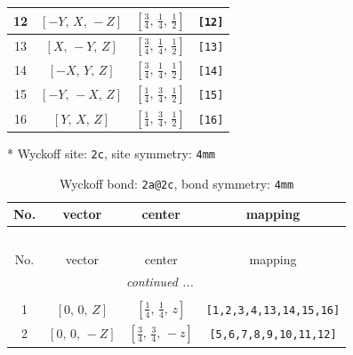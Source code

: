 \documentclass[fleqn,8pt]{jsarticle}
\begin{document}
\begin{longtable}{cccc}
12 & $\left[ - Y,\, X,\, - Z \right]$ & $\left[ \frac{3}{4},\, \frac{1}{4},\, \frac{1}{2} \right]$ & {\tt [12]} \\ \hline
13 & $\left[ X,\, - Y,\, Z \right]$ & $\left[ \frac{3}{4},\, \frac{1}{4},\, \frac{1}{2} \right]$ & {\tt [13]} \\ \hline
14 & $\left[ - X,\, Y,\, Z \right]$ & $\left[ \frac{3}{4},\, \frac{1}{4},\, \frac{1}{2} \right]$ & {\tt [14]} \\ \hline
15 & $\left[ - Y,\, - X,\, Z \right]$ & $\left[ \frac{1}{4},\, \frac{3}{4},\, \frac{1}{2} \right]$ & {\tt [15]} \\ \hline
16 & $\left[ Y,\, X,\, Z \right]$ & $\left[ \frac{1}{4},\, \frac{3}{4},\, \frac{1}{2} \right]$ & {\tt [16]} \\
\end{longtable}
* Wyckoff site: {\tt 2c}, site symmetry: {\tt 4mm}
\renewcommand{\arraystretch}{1.2}
\begin{longtable}{cccc}
\caption{Wyckoff bond: {\tt 2a@2c}, bond symmetry: {\tt 4mm}}
 \\
 \hline \hline
No. & vector & center & mapping \\ \hline \endfirsthead

\multicolumn{3}{l}{\tablename\ \thetable{}} \\
 \hline \hline
No. & vector & center & mapping \\ \hline \endhead

 \hline \hline
\multicolumn{3}{r}{\footnotesize\it continued ...} \\ \endfoot

 \hline \hline
\multicolumn{3}{r}{} \\ \endlastfoot

1 & $\left[ 0,\, 0,\, Z \right]$ & $\left[ \frac{1}{4},\, \frac{1}{4},\, z \right]$ & {\tt [1,2,3,4,13,14,15,16]} \\ \hline
2 & $\left[ 0,\, 0,\, - Z \right]$ & $\left[ \frac{3}{4},\, \frac{3}{4},\, - z \right]$ & {\tt [5,6,7,8,9,10,11,12]} \\
\end{longtable}
\renewcommand{\arraystretch}{1.2}
\end{document}
